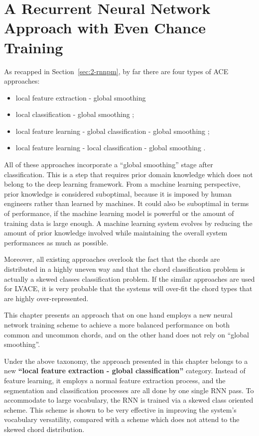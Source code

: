 
\chapter{A Recurrent Neural Network Approach with Even Chance Training}\label{cp:endtoend}
\noindent
As recapped in Section~\ref{sec:2-rnnpm}, by far there are four types of ACE approaches:
\begin{itemize}
\item local feature extraction - global smoothing \cite{fujishima1999realtime,sheh2003chord}
\item local classification - global smoothing \cite{humphrey2012rethinking};
\item local feature learning - global classification - global smoothing \cite{boulanger2013audio,sigtia2015audio};
\item local feature learning - local classification - global smoothing \cite{zhou2015chord}.
\end{itemize}
All of these approaches incorporate a ``global smoothing'' stage after classification. This is a step that requires prior domain knowledge which does not belong to the deep learning framework. From a machine learning perspective, prior knowledge is considered suboptimal, because it is imposed by human engineers rather than learned by machines. It could also be suboptimal in terms of performance, if the machine learning model is powerful or the amount of training data is large enough. A machine learning system evolves by reducing the amount of prior knowledge involved while maintaining the overall system performances as much as possible.

Moreover, all existing approaches overlook the fact that the chords are distributed in a highly uneven way and that the chord classification problem is actually a skewed classes classification problem. If the similar approaches are used for LVACE, it is very probable that the systems will over-fit the chord types that are highly over-represented.

This chapter presents an approach that on one hand employs a new neural network training scheme to achieve a more balanced performance on both common and uncommon chords, and on the other hand does not rely on ``global smoothing''.

Under the above taxonomy, the approach presented in this chapter belongs to a new \textbf{``local feature extraction - global classification''} category. Instead of feature learning, it employs a normal feature extraction process, and the segmentation and classification processes are all done by one single RNN pass. To accommodate to large vocabulary, the RNN is trained via a skewed class oriented scheme. This scheme is shown to be very effective in improving the system's vocabulary versatility, compared with a scheme which does not attend to the skewed chord distribution.


